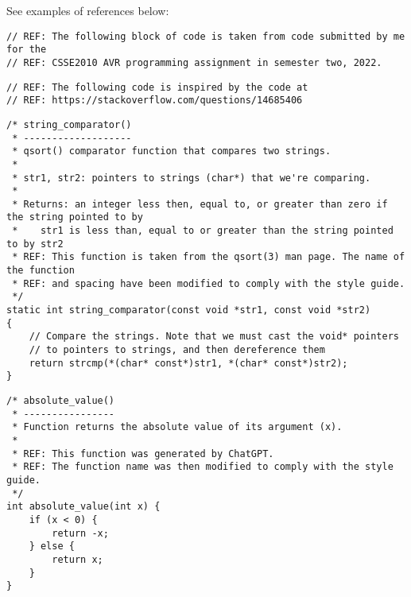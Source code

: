 \documentclass{article}
\begin{document}
See examples of references below:

\nolinenumbers
{}
\begin{lstlisting}
// REF: The following block of code is taken from code submitted by me for the
// REF: CSSE2010 AVR programming assignment in semester two, 2022. 
\end{lstlisting}

\begin{lstlisting}
// REF: The following code is inspired by the code at 
// REF: https://stackoverflow.com/questions/14685406
\end{lstlisting}

 
\begin{lstlisting}
/* string_comparator()
 * -------------------
 * qsort() comparator function that compares two strings.
 *
 * str1, str2: pointers to strings (char*) that we're comparing. 
 *
 * Returns: an integer less then, equal to, or greater than zero if the string pointed to by 
 *    str1 is less than, equal to or greater than the string pointed to by str2
 * REF: This function is taken from the qsort(3) man page. The name of the function 
 * REF: and spacing have been modified to comply with the style guide.
 */
static int string_comparator(const void *str1, const void *str2)
{
    // Compare the strings. Note that we must cast the void* pointers
    // to pointers to strings, and then dereference them
    return strcmp(*(char* const*)str1, *(char* const*)str2);
}
\end{lstlisting}

\begin{lstlisting}
/* absolute_value()
 * ----------------
 * Function returns the absolute value of its argument (x).
 *
 * REF: This function was generated by ChatGPT.
 * REF: The function name was then modified to comply with the style guide.
 */
int absolute_value(int x) {
    if (x < 0) {
        return -x;
    } else {
        return x;
    }
}
\end{lstlisting}
\end{document}
